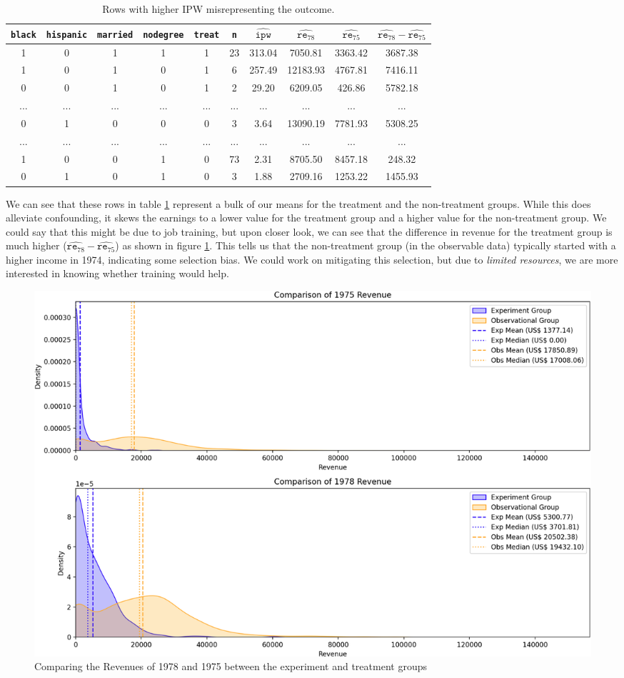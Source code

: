 \documentclass[12pt]{article}
\begin{document}
\begin{table}[h]
\centering
\begin{tabular}{|c|c|c|c|c|c|c|c|c|c|}
\hline
\texttt{black} & \texttt{hispanic} & \texttt{married} & \texttt{nodegree} & \texttt{treat} & \texttt{n} & $\hat{\texttt{ipw}}$ & $\hat{\texttt{re}_{78}}$ & $\hat{\texttt{re}_{75}}$ & $\hat{\texttt{re}_{78}} - \hat{\texttt{re}_{75}}$ \\
\hline
1 & 0 & 1 & 1 & 1 & 23 & 313.04 & 7050.81 & 3363.42 & 3687.38 \\
1 & 0 & 1 & 0 & 1 & 6 & 257.49 & 12183.93 & 4767.81 & 7416.11 \\
0 & 0 & 1 & 0 & 1 & 2 & 29.20 & 6209.05 & 426.86 & 5782.18 \\
... & ... & ... & ... & ... & ... & ... & ... & ... & ... \\
0 & 1 & 0 & 0 & 0 & 3 & 3.64 & 13090.19 & 7781.93 & 5308.25 \\
... & ... & ... & ... & ... & ... & ... & ... & ... & ... \\
1 & 0 & 0 & 1 & 0 & 73 & 2.31 & 8705.50 & 8457.18 & 248.32 \\
0 & 1 & 0 & 1 & 0 & 3 & 1.88 & 2709.16 & 1253.22 & 1455.93 \\
\hline
\end{tabular}
\caption{Rows with higher IPW misrepresenting the outcome.}
\label{tab:high_weightage}
\end{table}

We can see that these rows in table \ref{tab:high_weightage} represent a bulk of our means for the treatment and the non-treatment groups. While this does alleviate confounding, it skews the earnings to a lower value for the treatment group and a higher value for the non-treatment group. We could say that this might be due to job training, but upon closer look, we can see that the difference in revenue for the treatment group is much higher ($\hat{\texttt{re}_{78}} - \hat{\texttt{re}_{75}}$) as shown in figure \ref{fig:rev1975_78}. This tells us that the non-treatment group (in the observable data) typically started with a higher income in 1974, indicating some selection bias. We could work on mitigating this selection, but due to \textit{limited resources}, we are more interested in knowing whether training would help.

\begin{figure}
    \centering
    \includegraphics[width=0.7\linewidth]{rev1975_78.png}
    \caption{Comparing the Revenues of 1978 and 1975 between the experiment and treatment groups}
    \label{fig:rev1975_78}
\end{figure}
\end{document}
